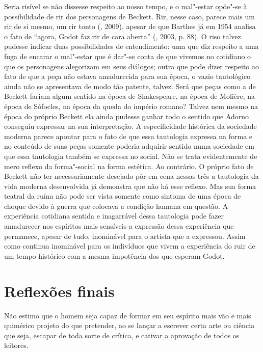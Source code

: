 {Seria risível se não dissesse respeito ao nosso tempo, e o mal"-estar
opõe"-se à possibilidade de rir dos personagens de Beckett. Rir, nesse
caso, parece mais um rir de si mesmo, um rir tonto (, 2009),
apesar de que Barthes já em 1954 analisa o fato de ``agora, Godot faz
rir de cara aberta'' (, 2003, p. 88). O riso talvez pudesse
indicar duas possibilidades de entendimento: uma que diz respeito a uma
fuga de encarar o mal"-estar que é dar"-se conta de que vivemos no
cotidiano o que os personagens alegorizam em seus diálogos; outra que
pode dizer respeito ao fato de que a peça não estava amadurecida para
sua época, o vazio tautológico ainda não se apresentava de modo tão
patente, talvez. Será que peças como a de Beckett fariam algum sentido
na época de Shakespeare, na época de Molière, na época de Sófocles, na
época da queda do império romano? Talvez nem mesmo na época do próprio
Beckett ela ainda pudesse ganhar todo o sentido que Adorno conseguiu
expressar na sua interpretação. A especificidade histórica da sociedade
moderna parece apontar para o fato de que essa tautologia expressa na
forma e no conteúdo de suas peças somente poderia adquirir sentido numa
sociedade em que essa tautologia também se expressa no social. Não se
trata evidentemente de mero reflexo da forma"-social na forma estética.
Ao contrário. O próprio fato de Beckett não ter necessariamente desejado
pôr em cena nessas três a tautologia da vida moderna desenvolvida já
demonstra que não há esse reflexo. Mas sua forma teatral da ruína não
pode ser vista somente como sintoma de uma época de choque devido à
guerra que colocava a condição humana em questão. A experiência
cotidiana sentida e inagarrável dessa tautologia pode fazer amadurecer
nos espíritos mais sensíveis a expressão dessa experiência que
permanece, apesar de tudo, inominável para o artista que a expressou.
Assim como continua inominável para os indivíduos que vivem a
experiência do ruir de um tempo histórico com a mesma impotência dos que
esperam Godot.

\chapter{Reflexões finais}

\begin{flushright}
\scriptsize{Não estimo que o homem seja capaz de formar em seu espírito mais vão e
mais quimérico projeto do que pretender, ao se lançar a escrever certa
arte ou ciência que seja, escapar de toda sorte de crítica, e cativar a
aprovação de todos os leitores.

}
\end{flushright}}
